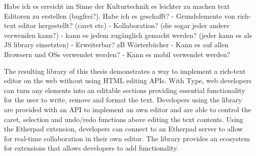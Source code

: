 Habe ich es erreicht im Sinne der Kulturtechnik es leichter zu machen text Editoren zu erstellen (bugfrei?).
Habe ich es geschafft?
 - Grundelemente von rich-text editor hergestellt? (caret etc)
 - Kollaboration? (die sogar jeder andere verwenden kann?)
 - kann es jedem zugänglich gemacht werden? (jeder kann es als JS library einsetzten)
 - Erweiterbar? zB Wörterbücher
 - Kann es auf allen Browsern und OSs verwendet werden?
 - Kann es mobil verwendet werden?





The resulting library of this thesis demonstrates a way to implement a rich-text editor on the web without using HTML editing APIs. With Type, web developers can turn any elements into an editable sections providing essential functionality for the user to write, remove and format the text. Developers using the library are provided with an API to implement an own editor and are able to control the caret, selection and undo/redo functions above editing the text contents. Using the Etherpad extension, developers can connect to an Etherpad server to allow for real-time collaboration in their own editor. The library provides an ecosystem for extensions that allows developers to add functionality.







